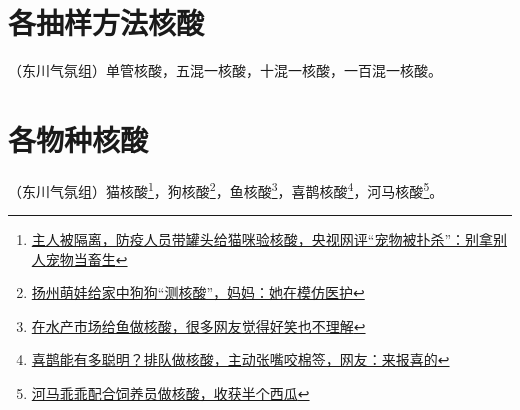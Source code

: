 \documentclass{ctexbook}
\begin{document}
\section{各抽样方法核酸}
（东川气氛组）单管核酸，五混一核酸，十混一核酸，一百混一核酸。

\section{各物种核酸}
（东川气氛组）猫核酸\footnote{\href{https://www.163.com/dy/article/GOS3PHOI05199NPP.html}{主人被隔离，防疫人员带罐头给猫咪验核酸，央视网评“宠物被扑杀”：别拿别人宠物当畜生}}，狗核酸\footnote{\href{https://www.thepaper.cn/newsDetail_forward_13916282}{扬州萌娃给家中狗狗“测核酸”，妈妈：她在模仿医护}}，鱼核酸\footnote{\href{https://www.163.com/dy/article/H3KS18UU0552Y6AK.html}{在水产市场给鱼做核酸，很多网友觉得好笑也不理解}}，喜鹊核酸\footnote{\href{https://www.163.com/dy/article/GUR8U0RM0522CD4O.html}{喜鹊能有多聪明？排队做核酸，主动张嘴咬棉签，网友：来报喜的}}，河马核酸\footnote{\href{https://www.thepaper.cn/newsDetail_forward_17997745}{河马乖乖配合饲养员做核酸，收获半个西瓜}}。
\end{document}
